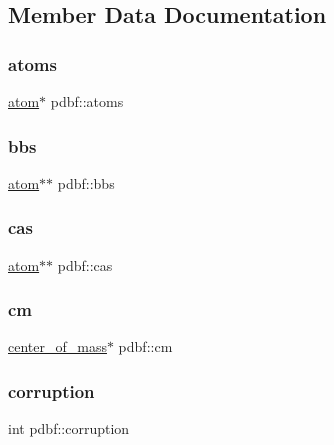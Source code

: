 \subsection{Member Data Documentation}
\mbox{\label{structpdbf_aa582271e2b7d1d659f86ee27846d7a96}} 
\subsubsection{\texorpdfstring{atoms}{atoms}}
{\footnotesize\ttfamily \hyperlink{structatom}{atom}$\ast$ pdbf\+::atoms}

\mbox{\label{structpdbf_af61e2b265a60d64feed10fd0ab7258a2}} 
\subsubsection{\texorpdfstring{bbs}{bbs}}
{\footnotesize\ttfamily \hyperlink{structatom}{atom}$\ast$$\ast$ pdbf\+::bbs}

\mbox{\label{structpdbf_a8fe8603ea76642263584103b2f574306}} 
\subsubsection{\texorpdfstring{cas}{cas}}
{\footnotesize\ttfamily \hyperlink{structatom}{atom}$\ast$$\ast$ pdbf\+::cas}

\mbox{\label{structpdbf_a2124a322f26cb63ebaebe107a55c6f17}} 
\subsubsection{\texorpdfstring{cm}{cm}}
{\footnotesize\ttfamily \hyperlink{structcenter__of__mass}{center\+\_\+of\+\_\+mass}$\ast$ pdbf\+::cm}

\mbox{\label{structpdbf_af233eba06a2f4916dc76af49e447a013}} 
\subsubsection{\texorpdfstring{corruption}{corruption}}
{\footnotesize\ttfamily int pdbf\+::corruption}

